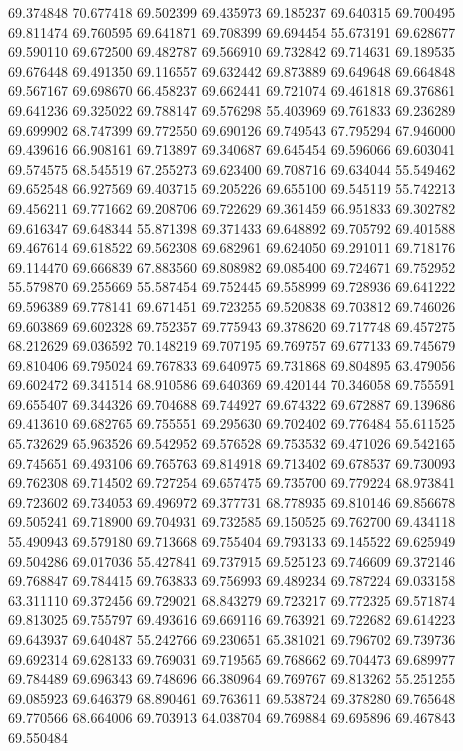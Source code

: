 69.374848
70.677418
69.502399
69.435973
69.185237
69.640315
69.700495
69.811474
69.760595
69.641871
69.708399
69.694454
55.673191
69.628677
69.590110
69.672500
69.482787
69.566910
69.732842
69.714631
69.189535
69.676448
69.491350
69.116557
69.632442
69.873889
69.649648
69.664848
69.567167
69.698670
66.458237
69.662441
69.721074
69.461818
69.376861
69.641236
69.325022
69.788147
69.576298
55.403969
69.761833
69.236289
69.699902
68.747399
69.772550
69.690126
69.749543
67.795294
67.946000
69.439616
66.908161
69.713897
69.340687
69.645454
69.596066
69.603041
69.574575
68.545519
67.255273
69.623400
69.708716
69.634044
55.549462
69.652548
66.927569
69.403715
69.205226
69.655100
69.545119
55.742213
69.456211
69.771662
69.208706
69.722629
69.361459
66.951833
69.302782
69.616347
69.648344
55.871398
69.371433
69.648892
69.705792
69.401588
69.467614
69.618522
69.562308
69.682961
69.624050
69.291011
69.718176
69.114470
69.666839
67.883560
69.808982
69.085400
69.724671
69.752952
55.579870
69.255669
55.587454
69.752445
69.558999
69.728936
69.641222
69.596389
69.778141
69.671451
69.723255
69.520838
69.703812
69.746026
69.603869
69.602328
69.752357
69.775943
69.378620
69.717748
69.457275
68.212629
69.036592
70.148219
69.707195
69.769757
69.677133
69.745679
69.810406
69.795024
69.767833
69.640975
69.731868
69.804895
63.479056
69.602472
69.341514
68.910586
69.640369
69.420144
70.346058
69.755591
69.655407
69.344326
69.704688
69.744927
69.674322
69.672887
69.139686
69.413610
69.682765
69.755551
69.295630
69.702402
69.776484
55.611525
65.732629
65.963526
69.542952
69.576528
69.753532
69.471026
69.542165
69.745651
69.493106
69.765763
69.814918
69.713402
69.678537
69.730093
69.762308
69.714502
69.727254
69.657475
69.735700
69.779224
68.973841
69.723602
69.734053
69.496972
69.377731
68.778935
69.810146
69.856678
69.505241
69.718900
69.704931
69.732585
69.150525
69.762700
69.434118
55.490943
69.579180
69.713668
69.755404
69.793133
69.145522
69.625949
69.504286
69.017036
55.427841
69.737915
69.525123
69.746609
69.372146
69.768847
69.784415
69.763833
69.756993
69.489234
69.787224
69.033158
63.311110
69.372456
69.729021
68.843279
69.723217
69.772325
69.571874
69.813025
69.755797
69.493616
69.669116
69.763921
69.722682
69.614223
69.643937
69.640487
55.242766
69.230651
65.381021
69.796702
69.739736
69.692314
69.628133
69.769031
69.719565
69.768662
69.704473
69.689977
69.784489
69.696343
69.748696
66.380964
69.769767
69.813262
55.251255
69.085923
69.646379
68.890461
69.763611
69.538724
69.378280
69.765648
69.770566
68.664006
69.703913
64.038704
69.769884
69.695896
69.467843
69.550484
